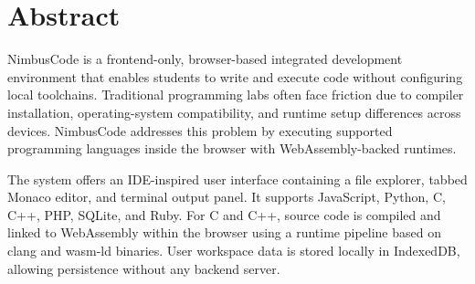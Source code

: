
\usepackage{longtable}
\usepackage{array}
\usepackage{enumitem}
\usepackage{setspace}
\usetikzlibrary{positioning}


\newcommand{\logpage}[4]{%
\subsection*{Appendix E.#1: Iteration and Progress Log}
\textbf{Iteration Goal:} #2\\[4pt]
\textbf{Primary Tasks Completed:} #3\\[4pt]
\textbf{Observations and Outcomes:} #4

\vspace{0.6cm}
\textbf{Deliverables recorded for this iteration:}
\begin{itemize}[leftmargin=8mm]
\item Updated source modules and refactored client-side workflow.
\item Regression checks through manual run/lint/build verification.
\item Documentation updates reflecting architectural and testing changes.
\item Risk log updated with mitigation notes and pending improvements.
\end{itemize}

\vfill
\textbf{Status:} Completed and documented for college project submission.
\newpage
}




\section*{Abstract}
NimbusCode is a frontend-only, browser-based integrated development environment that enables students to write and execute code without configuring local toolchains. Traditional programming labs often face friction due to compiler installation, operating-system compatibility, and runtime setup differences across devices. NimbusCode addresses this problem by executing supported programming languages inside the browser with WebAssembly-backed runtimes.

The system offers an IDE-inspired user interface containing a file explorer, tabbed Monaco editor, and terminal output panel. It supports JavaScript, Python, C, C++, PHP, SQLite, and Ruby. For C and C++, source code is compiled and linked to WebAssembly within the browser using a runtime pipeline based on clang and wasm-ld binaries. User workspace data is stored locally in IndexedDB, allowing persistence without any backend server.

